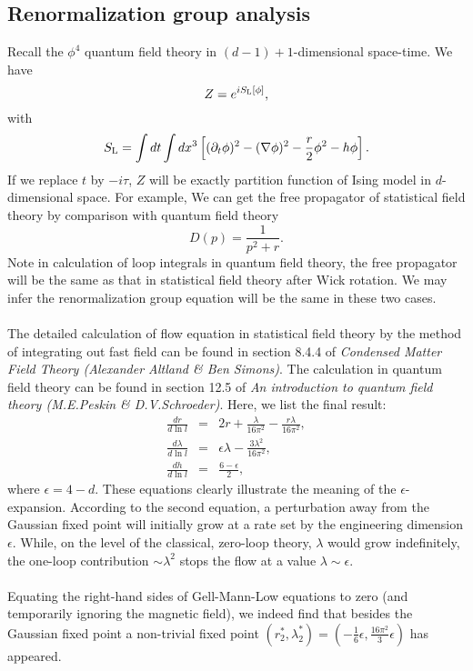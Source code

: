 \subsection{Renormalization group analysis}
Recall the  $\phi^4$ quantum field theory in $(d-1) + 1$-dimensional space-time. We have
\[Z = e^{iS_{\rm L}[\phi]},\]
with
\[S_{\rm L} = \int dt \int dx^3 \left[(\partial_t \phi)^2 - (\nabla \phi)^2 - \frac{r}{2}\phi^2 -h \phi \right].\]
If we replace $t$ by $-i\tau$, $Z$ will be exactly partition function of Ising model in $d$-dimensional space. For example, We can get the free propagator of statistical field theory by comparison with quantum field theory
\[D(p) = \frac{1}{p^2+r}.\]
Note in calculation of loop integrals in quantum field theory, the free propagator will be the same as that in statistical field theory after Wick rotation. We may infer the renormalization group equation will be the same in these two cases. 
\\ \\
The detailed calculation of flow equation in statistical field theory by the method of integrating out fast field can be found in section 8.4.4 of \emph{Condensed Matter Field Theory (Alexander Altland \& Ben Simons)}. The calculation in quantum field theory can be found in section 12.5 of \emph{An introduction to quantum field theory (M.E.Peskin \& D.V.Schroeder)}. Here, we list the final result:
\begin{eqnarray}
\frac{dr}{d\ln l} &=& 2r + \frac{\lambda}{16 \pi^2} - \frac{r\lambda}{16\pi^2} ,\nonumber \\
\frac{d\lambda}{d\ln l} &=& \epsilon \lambda - \frac{3\lambda^2}{16\pi^2} ,\nonumber \\
\frac{dh}{d\ln l} &=& \frac{6 - \epsilon}{2} ,\nonumber
\end{eqnarray}
where $\epsilon = 4-d$.
These equations clearly illustrate the meaning of the $\epsilon$-expansion. According to the second equation, a perturbation away from the Gaussian fixed point will initially grow at a rate set by the engineering dimension $\epsilon$. While, on the level of the classical, zero-loop theory, $\lambda$ would grow indefinitely, the one-loop contribution $\sim \lambda^2$ stops the flow at a value $\lambda \sim \epsilon$.
\\ \\
Equating the right-hand sides of Gell-Mann-Low equations to zero (and temporarily ignoring the magnetic field), we indeed find that besides the Gaussian fixed point a non-trivial fixed point $(r_2^*, \lambda_2^*) = (-\frac{1}{6}\epsilon, \frac{16\pi^2}{3}\epsilon)$ has appeared.
